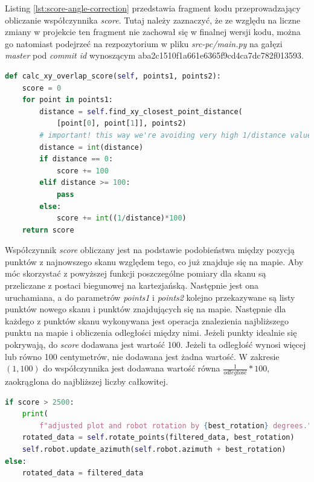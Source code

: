 Listing \ref{lst:score-angle-correction} przedstawia fragment kodu przeprowadzający obliczanie współczynnika \emph{score}. Tutaj należy zaznaczyć, że ze względu na liczne zmiany w projekcie ten fragment nie zachował się w finalnej wersji kodu, można go natomiast podejrzeć na rezpozytorium w pliku \emph{src-pc/main.py} na gałęzi \emph{master} pod \emph{commit id} wynoszącym aba2c1510f1a661e6365f9cd4ca7dc782f013593.

\begin{lstlisting}[basicstyle=\footnotesize\ttfamily,language=python,caption=Obliczanie współczynnika \emph{score} i korekcja kąta w celu dopasowania pomiaru do mapy,label=lst:score-angle-correction]
def calc_xy_overlap_score(self, points1, points2):
    score = 0
    for point in points1:
        distance = self.find_xy_closest_point_distance(
            [point[0], point[1]], points2)
        # important! this way we're avoiding very high 1/distance value
        distance = int(distance)
        if distance == 0:
            score += 100
        elif distance >= 100:
            pass
        else:
            score += int((1/distance)*100)
    return score
\end{lstlisting}

Współczynnik \emph{score} obliczany jest na podstawie podobieństwa między pozycją punktów z najnowszego skanu względem tego, co już znajduje się na mapie. Aby móc skorzystać z powyższej funkcji poszczególne pomiary dla skanu są przeliczane z postaci biegunowej na kartezjańską. Następnie jest ona uruchamiana, a do parametrów \emph{points1} i \emph{points2} kolejno przekazywane są listy punktów nowego skanu i punktów znajdujących się na mapie. Następnie dla każdego z punktów skanu wykonywana jest operacja znalezienia najbliższego punktu na mapie i obliczenia odległości między nimi. Jeżeli punkty idealnie się pokrywają, do \emph{score} dodawana jest wartość 100. Jeżeli ta odległość wynosi więcej lub równo 100 centymetrów, nie dodawana jest żadna wartość. W zakresie $(1,100)$ do współczynnika jest dodawana wartość równa $\frac{1}{odległość}*100$, zaokrąglona do najbliższej liczby całkowitej. 

\begin{lstlisting}[basicstyle=\footnotesize\ttfamily,language=python,caption=Decyzja o zastosowaniu korekty,label=lst:score-threshold]
if score > 2500:
    print(
        f"adjusted plot and robot rotation by {best_rotation} degrees.")
    rotated_data = self.rotate_points(filtered_data, best_rotation)
    self.robot.update_azimuth(self.robot.azimuth + best_rotation)
else:
    rotated_data = filtered_data
\end{lstlisting}

